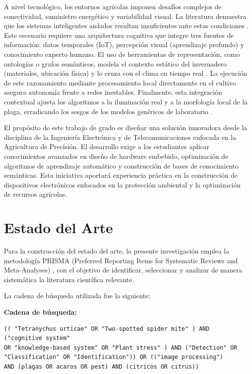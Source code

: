 \documentclass[12pt,letterpaper]{article}
\begin{document}
A nivel tecnológico, los entornos agrícolas imponen desafíos complejos de conectividad, suministro energético y variabilidad visual. La literatura demuestra que los sistemas inteligentes aislados resultan insuficientes ante estas condiciones \cite{yu2025}. Este escenario requiere una arquitectura cognitiva que integre tres fuentes de información: datos temporales (IoT), percepción visual (aprendizaje profundo) y conocimiento experto humano. El uso de herramientas de representación, como ontologías o grafos semánticos, modela el contexto estático del invernadero (materiales, ubicación física) y lo cruza con el clima en tiempo real \cite{umar2024ontology}. La ejecución de este razonamiento mediante procesamiento local directamente en el cultivo asegura autonomía frente a redes inestables. Finalmente, esta integración contextual ajusta los algoritmos a la iluminación real y a la morfología local de la plaga, erradicando los sesgos de los modelos genéricos de laboratorio \cite{tomatoPests}.

El propósito de este trabajo de grado es diseñar una solución innovadora desde la disciplina de la Ingeniería Electrónica y de Telecomunicaciones enfocada en la Agricultura de
Precisión. El desarrollo exige a los estudiantes aplicar conocimientos avanzados en diseño de hardware embebido, optimización de algoritmos de aprendizaje automático y construcción de bases de conocimiento semánticas. Esta iniciativa aportará experiencia práctica en la construcción de dispositivos electrónicos enfocados en la protección ambiental y la optimización de recursos agrícolas.


\section{Estado del Arte}

Para la construcción del estado del arte, la presente investigación emplea la metodología PRISMA (Preferred Reporting Items for Systematic Reviews and Meta-Analyses) \cite{prisma2020}, con el objetivo de identificar, seleccionar y analizar de manera sistemática la literatura científica relevante.

La cadena de búsqueda utilizada fue la siguiente:

\textbf{Cadena de búsqueda:}

\begin{verbatim}
(( "Tetranychus urticae" OR "Two-spotted spider mite" ) AND ("cognitive system"
OR "knowledge-based system" OR "Plant stress" ) AND ("Detection" OR 
"Classification" OR "Identification")) OR (("image processing")
AND (plagas OR acaros OR pest) AND (citricos OR citrus))
\end{verbatim}
\end{document}
